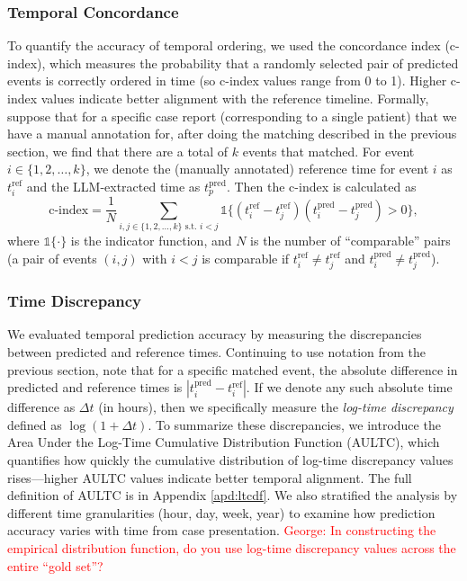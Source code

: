 \subsubsection{Temporal Concordance}
To quantify the accuracy of temporal ordering, we used the concordance index (c-index), which measures the probability that a randomly selected pair of predicted events is correctly ordered in time (so c-index values range from 0 to 1). Higher c-index values indicate better alignment with the reference timeline. Formally, suppose that for a specific case report (corresponding to a single patient) that we have a manual annotation for, after doing the matching described in the previous section, we find that there are a total of $k$ events that matched. For event $i\in\{1,2,\dots,k\}$, we denote the (manually annotated) reference time for event $i$ as $t_i^{\text{ref}}$ and the LLM-extracted time as $t_p^{\text{pred}}$. Then the c-index is calculated as
\[
\text{c-index} = \frac{1}{N} \sum_{i,j\in\{1,2,\dots,k\}\text{ s.t.~}i<j} {\mathds{1}\{(t^{\text{ref}}_i - t^\text{ref}_j)(t^{\text{pred}}_i - t^{\text{pred}}_j) > 0\}},
\]
where $\mathds{1}\{\cdot\}$ is the indicator function, and $N$ is the number of ``comparable'' pairs (a pair of events $(i,j)$ with $i<j$ is comparable if $t^{\text{ref}}_i \neq t^{\text{ref}}_j$ and $t^{\text{pred}}_i \neq t^{\text{pred}}_j$).


\subsubsection{Time Discrepancy}
We evaluated temporal prediction accuracy by measuring the discrepancies between predicted and reference times. Continuing to use notation from the previous section, note that for a specific matched event, the absolute difference in predicted and reference times is $|t_i^{\text{pred}} - t_i^{\text{ref}}|$. If we denote any such absolute time difference as $\Delta t$ (in hours), then we specifically measure the \emph{log-time discrepancy} defined as $\log(1 + \Delta t)$. To summarize these discrepancies, we introduce the Area Under the Log-Time Cumulative Distribution Function (AULTC), which quantifies how quickly the cumulative distribution of log-time discrepancy values rises---higher AULTC values indicate better temporal alignment. The full definition of AULTC is in Appendix \ref{apd:ltcdf}. We also stratified the analysis by different time granularities (hour, day, week, year) to examine how prediction accuracy varies with time from case presentation. \textcolor{red}{George: In constructing the empirical distribution function, do you use log-time discrepancy values across the entire ``gold set''?}

